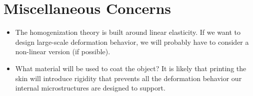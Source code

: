 \documentclass[10pt]{article}
\begin{document}
\section{Miscellaneous Concerns}
\begin{itemize}
    \item The homogenization theory is built around linear elasticity. If we want to
        design large-scale deformation behavior, we will probably have to
        consider a non-linear version (if possible).

    \item What material will be used to coat the object? It is likely that
        printing the skin will introduce rigidity that prevents all the
        deformation behavior our internal microstructures are designed to
        support.
\end{itemize}





\end{document}
